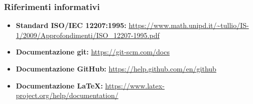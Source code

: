 		\subsubsection{Riferimenti informativi}
			\begin{itemize}
				\item \textbf{Standard ISO/IEC 12207:1995: }\url{https://www.math.unipd.it/~tullio/IS-1/2009/Approfondimenti/ISO_12207-1995.pdf}
				\item \textbf{Documentazione git: }\url{https://git-scm.com/docs} 
				\item \textbf{Documentazione GitHub: }\url{https://help.github.com/en/github}
				\item \textbf{Documentazione LaTeX: }\url{https://www.latex-project.org/help/documentation/}
			\end{itemize}
		

